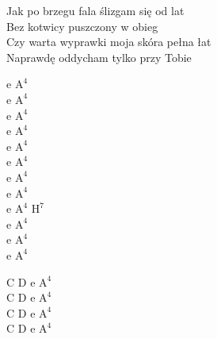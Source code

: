 \begin{text}
\begin{footTwelve}
Jak po brzegu fala ślizgam się od lat\\
Bez kotwicy puszczony w obieg\\
Czy warta wyprawki moja skóra pełna łat\\
Naprawdę oddycham tylko przy Tobie
\end{footTwelve}
\end{text}
\begin{chord}
    \begin{footTwelve}
e $\mathrm{A^4}$\\
e $\mathrm{A^4}$\\
e $\mathrm{A^4}$\\
e $\mathrm{A^4}$\\
e $\mathrm{A^4}$\\
e $\mathrm{A^4}$\\
e $\mathrm{A^4}$\\
e $\mathrm{A^4}$\\
    e $\mathrm{A^4}$ $\mathrm{H^7}$\\
    e $\mathrm{A^4}$\\
    e $\mathrm{A^4}$\\
    e $\mathrm{A^4}$

    C D e $\mathrm{A^4}$\\
C D e $\mathrm{A^4}$\\
C D e $\mathrm{A^4}$\\
C D e $\mathrm{A^4}$
\end{footTwelve}
\end{chord}
